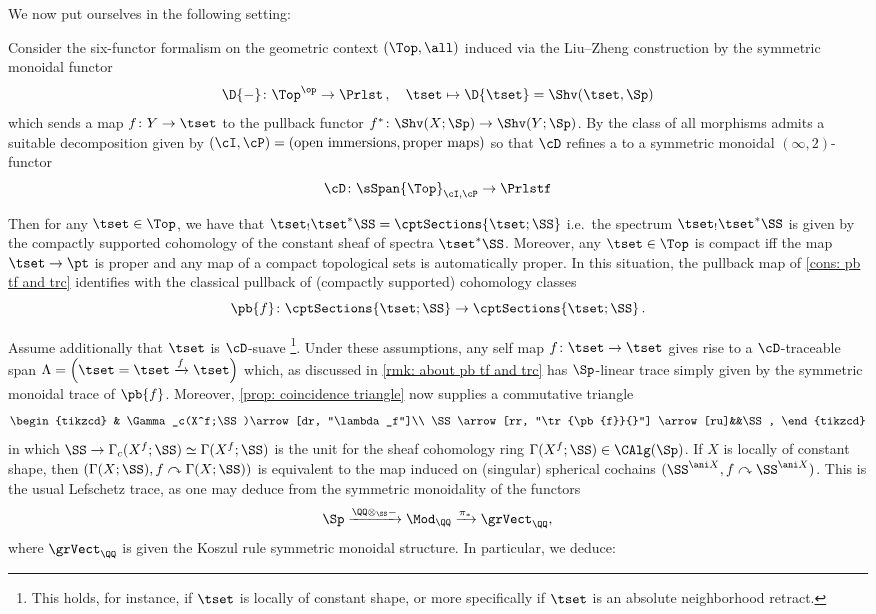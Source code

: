 We now put ourselves in the following setting:

\begin{set}\label{set: tset}
  Consider the six-functor formalism on the geometric context
  $(\Top, \all)$ induced via the
  Liu--Zheng construction by the symmetric monoidal functor
  \[ \D{-}\colon \Top^\op \to \Prlst\,,\quad \tset \mapsto \D{\tset}=\Shv(\tset,\Sp) \]
  which sends a map $f\colon Y\to \tset$ to the pullback functor $f^*\colon\Shv (X;\Sp )\to\Shv (Y;\Sp )$. 
  By  the class of all morphisms admits a suitable decomposition given by
  $(\cI ,\cP ) = (\textrm{open immersions}, \textrm{proper maps})$
  so that $\cD$ refines a to a symmetric monoidal $(\infty,2)$-functor
  \[ \cD\colon \sSpan{\Top}_{\cI,\cP}\to \Prlstf \]
  \end{set}

  Then for any $\tset \in \Top$, we have that $\tset_!\tset^* \SS= \cptSections{\tset;\SS}$
  i.e.~the spectrum $\tset_!\tset^* \SS$ is given by the
  compactly supported cohomology of the constant sheaf of spectra $\tset^*\SS$. 
  Moreover, any $\tset \in \Top$ is compact iff the map $\tset \to \pt$ is proper and any map of a compact topological sets is automatically proper. 
  In this situation, the pullback map of \cref{cons: pb tf and trc} 
  identifies with the
  classical pullback of (compactly supported) cohomology classes
  \[ \pb{f}\colon \cptSections{\tset;\SS}\to \cptSections{\tset;\SS}\,.\]
  
  Assume additionally that $\tset$ is $\cD$-suave \footnote{This holds, for instance, if $\tset$ is locally of constant shape, or more specifically if $\tset$ is an absolute neighborhood retract.}. 
  Under these assumptions, any self map $f\colon \tset \to \tset$
  gives rise to a $\cD$-traceable span 
  $\Lambda =\left(\tset= \tset \xrightarrow{f}\tset \right)$ which, as discussed
  in \cref{rmk: about pb tf and trc} has $\Sp$-linear trace simply 
  given by the symmetric monoidal trace of $\pb{f}$. 
  Moreover, \cref{prop: coincidence triangle} now supplies a commutative triangle
  \begin{equation}
    \label{eq:topological-lefschetz-trace}
    \begin{tikzcd}
      & \Gamma_c(X^f;\SS )\arrow[dr, "\lambda_f"]\\
      \SS\arrow[rr, "\tr{\pb{f}}{}"] \arrow[ru]&&\SS,
    \end{tikzcd}
  \end{equation}
  in which $\SS\to\Gamma_c(X^f;\SS )\simeq\Gamma (X^f;\SS )$ is the unit for the sheaf cohomology ring $\Gamma (X^f;\SS )\in\CAlg (\Sp)$. If $X$ is locally of constant shape, then $(\Gamma (X;\SS ),f\curvearrowright \Gamma (X;\SS ))$ is equivalent to the map induced on (singular) spherical cochains $(\SS^{\ani X},f\curvearrowright \SS^{\ani X})$. This is the usual Lefschetz trace, as one may deduce from the symmetric monoidality of the functors
  \[
    \Sp\xrightarrow{\QQ\otimes_{\SS}{-}}
    \Mod_{\QQ}\xrightarrow{\pi_*}
    \grVect_\QQ,
  \]
  where $\grVect_\QQ$ is given the Koszul rule symmetric monoidal structure. In particular, we deduce:
  
